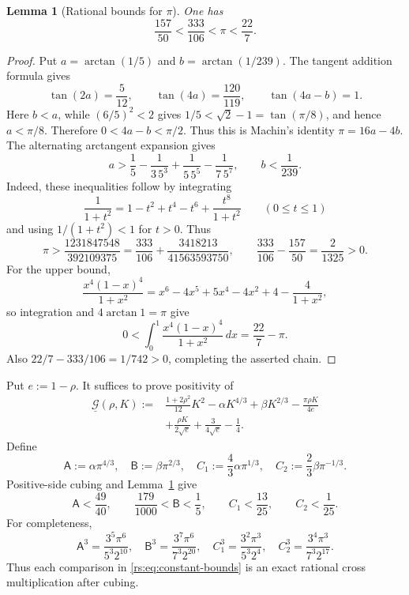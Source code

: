 \documentclass[11pt]{article}
\newtheorem{lemma}[theorem]{Lemma}
\theoremstyle{remark}
\begin{document}
\begin{lemma}[Rational bounds for $\pi$]
\label{rs:lem:rational-pi-bounds}
One has
\[
 \frac{157}{50}<\frac{333}{106}<\pi<\frac{22}{7}.
\]
\end{lemma}

\begin{proof}
Put $a=\arctan(1/5)$ and $b=\arctan(1/239)$.  The tangent addition
formula gives
\[
 \tan(2a)=\frac5{12},\qquad
 \tan(4a)=\frac{120}{119},\qquad
 \tan(4a-b)=1.
\]
Here $b<a$, while $(6/5)^2<2$ gives
$1/5<\sqrt2-1=\tan(\pi/8)$, and hence $a<\pi/8$.  Therefore
$0<4a-b<\pi/2$.  Thus this is Machin's identity
$\pi=16a-4b$.  The alternating arctangent expansion gives
\[
 a>\frac15-\frac1{3\,5^3}+\frac1{5\,5^5}-\frac1{7\,5^7},
 \qquad b<\frac1{239}.
\]
Indeed, these inequalities follow by integrating
\[
 \frac1{1+t^2}=1-t^2+t^4-t^6+\frac{t^8}{1+t^2}
 \qquad(0\leq t\leq1)
\]
and using $1/(1+t^2)<1$ for $t>0$.
Thus
\[
 \pi>
 \frac{1231847548}{392109375}
 =\frac{333}{106}+\frac{3418213}{41563593750},
 \qquad
 \frac{333}{106}-\frac{157}{50}=\frac2{1325}>0.
\]
For the upper bound,
\[
 \frac{x^4(1-x)^4}{1+x^2}
 =x^6-4x^5+5x^4-4x^2+4-\frac4{1+x^2},
\]
so integration and $4\arctan1=\pi$ give
\[
 0<\int_0^1\frac{x^4(1-x)^4}{1+x^2}\,dx
 =\frac{22}{7}-\pi.
\]
Also \(22/7-333/106=1/742>0\), completing the asserted chain.
\end{proof}

Put $e:=1-\rho$.  It suffices to prove positivity of
\begin{equation}
 \begin{aligned}
 \underline{\mathcal G}(\rho,K):={}&
 \frac{1+2\rho^2}{12}K^2
 -\alpha K^{4/3}+\beta K^{2/3}
 -\frac{\pi\rho K}{4e}\\
 &+\frac{\rho K}{2\sqrt e}
 +\frac3{4\sqrt e}-\frac14.
 \end{aligned}
 \label{rs:eq:G-under}
\end{equation}
Define
\begin{equation}
 \mathsf A:=\alpha\pi^{4/3},
 \quad \mathsf B:=\beta\pi^{2/3},
 \quad C_1:=\frac43\alpha\pi^{1/3},
 \quad C_2:=\frac23\beta\pi^{-1/3}.
 \label{rs:eq:scaled-constants}
\end{equation}
Positive-side cubing and Lemma~\ref{rs:lem:rational-pi-bounds} give
\begin{equation}
 \mathsf A<\frac{49}{40},
 \qquad
 \frac{179}{1000}<\mathsf B<\frac15,
 \qquad
 C_1<\frac{13}{25},
 \qquad
 C_2<\frac1{25}.
 \label{rs:eq:constant-bounds}
\end{equation}
For completeness,
\begin{equation}
 \mathsf A^3=\frac{3^5\pi^6}{5^3 2^{10}},
 \quad
 \mathsf B^3=\frac{3^7\pi^6}{7^3 2^{20}},
 \quad
 C_1^3=\frac{3^2\pi^3}{5^3 2^4},
 \quad
 C_2^3=\frac{3^4\pi^3}{7^3 2^{17}}.
 \label{rs:eq:constant-cubes}
\end{equation}
Thus each comparison in \eqref{rs:eq:constant-bounds} is an exact rational
cross multiplication after cubing.
\end{document}
